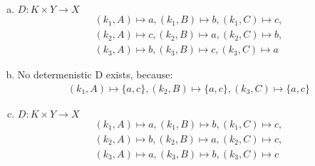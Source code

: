 \documentclass{article}
\begin{document}
	\maketitle
	\section{}
	\begin{enumerate}[a)]
	    \item
			$D: K\times Y\rightarrow X$
			\begin{align*}
				(k_1,A)\mapsto a,
				(k_1,B)\mapsto b,
				(k_1,C)\mapsto c,\\
				(k_2,A)\mapsto c,
				(k_2,B)\mapsto a,
				(k_2,C)\mapsto b,\\
				(k_3,A)\mapsto b,
				(k_3,B)\mapsto c,
				(k_3,C)\mapsto a\,
			\end{align*}
		\item
		    No determenistic D exists, because:
			\begin{align*}
				(k_1, A)\mapsto \{a,c\},
				(k_2, B)\mapsto \{a,c\},
				(k_3, C)\mapsto \{a,c\}
			\end{align*}
		\item
    		$D: K\times Y\rightarrow X$
    		\begin{align*}
    			(k_1,A)\mapsto a,
    			(k_1,B)\mapsto b,
    			(k_1,C)\mapsto c,\\
    			(k_2,A)\mapsto b,
    			(k_2,B)\mapsto a,
    			(k_2,C)\mapsto c,\\
    			(k_3,A)\mapsto a,
    			(k_3,B)\mapsto b,
    			(k_3,C)\mapsto c\,
    		\end{align*}
    \end{enumerate}
\end{document}
